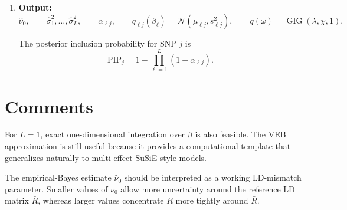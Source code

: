 \documentclass[11pt]{article}
\newcommand{\Rbar}{\bar R}
\newcommand{\nuo}{\nu_0}
\newcommand{\E}{\mathbb E}
\newcommand{\Normal}{\mathcal N}
\newcommand{\GIG}{\operatorname{GIG}}
\begin{document}
\begin{enumerate}[leftmargin=2em]
\begin{enumerate}[leftmargin=2em]
\begin{enumerate}[leftmargin=2em]
\item Compute \(\mathcal D_{\ell j}\) and update
\[
\alpha_{\ell j}
=
\frac{
\pi_{\ell j}\exp(\mathcal D_{\ell j})
}{
\sum_{k=1}^p
\pi_{\ell k}\exp(\mathcal D_{\ell k})
}.
\]

\end{enumerate}

\item Recompute
\[
m=\sum_{\ell=1}^L m_\ell
\]
and
\[
S_Q
=
m^\top A_\nu m
+
\sum_{\ell=1}^L
\left[
\sum_{j=1}^p
\alpha_{\ell j}m_{2,\ell j}(A_\nu)_{jj}
-
m_\ell^\top A_\nu m_\ell
\right].
\]

\item Update the shared \(q(\omega)\):
\[
\lambda=\frac{\nuo+3}{2},
\qquad
\chi=N S_Q,
\qquad
q(\omega)=\GIG(\lambda,\chi,1).
\]
Then update
\[
\eta=\E_q(\omega^{-1}).
\]

\item Optionally update
\[
\sigma_\ell^2
\leftarrow
\sum_{j=1}^p
\alpha_{\ell j}m_{2,\ell j},
\qquad
\ell=1,\dots,L.
\]

\item Optionally update \(\nuo\) by grid search or one-dimensional
optimization of \(\mathcal L_{\mathrm{SuSiE}}\).

\end{enumerate}

\item \textbf{Output:}
\[
\widehat\nuo,
\qquad
\widehat\sigma_1^2,\dots,\widehat\sigma_L^2,
\qquad
\alpha_{\ell j},
\qquad
q_{\ell j}(\beta_\ell)=\Normal(\mu_{\ell j},s_{\ell j}^2),
\qquad
q(\omega)=\GIG(\lambda,\chi,1).
\]

The posterior inclusion probability for SNP \(j\) is
\[
\mathrm{PIP}_j
=
1-
\prod_{\ell=1}^L
(1-\alpha_{\ell j}).
\]

\end{enumerate}

\section{Comments}

For \(L=1\), exact one-dimensional integration over \(\beta\) is also feasible. The VEB approximation is still useful because it provides a computational template that generalizes naturally to multi-effect SuSiE-style models.

The empirical-Bayes estimate \(\widehat\nuo\) should be interpreted as a working LD-mismatch parameter. Smaller values of \(\nuo\) allow more uncertainty around the reference LD matrix \(\Rbar\), whereas larger values concentrate \(R\) more tightly around \(\Rbar\).
\end{document}
